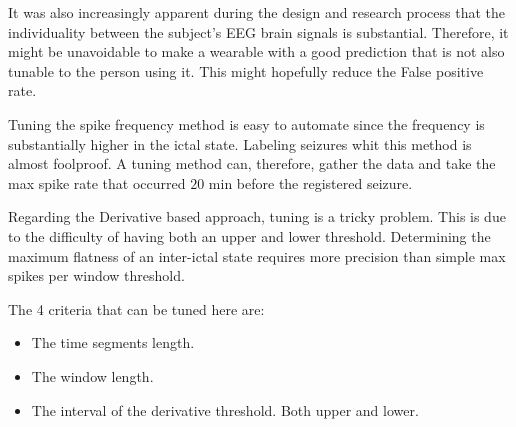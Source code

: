 It was also increasingly apparent during the design and research process that the individuality between the subject's EEG brain signals is substantial. Therefore, it might be unavoidable to make a wearable with a good prediction that is not also tunable to the person using it. This might hopefully reduce the False positive rate.



Tuning the spike frequency method is easy to automate since the frequency is substantially higher in the ictal state. Labeling seizures whit this method is almost foolproof. A tuning method can, therefore, gather the data and take the max spike rate that occurred $20$ min before the registered seizure. 


Regarding the Derivative based approach, tuning is a tricky problem. This is due to the difficulty of having both an upper and lower threshold. Determining the maximum flatness of an inter-ictal state requires more precision than simple max spikes per window threshold.

The 4 criteria that can be tuned here are:
\begin{itemize}
    \item The time segments length.
    \item The window length.
    \item The interval of the derivative threshold. Both upper and lower.
\end{itemize}

